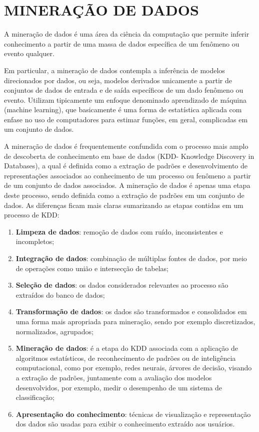\chapter{MINERAÇÃO DE DADOS}

A mineração de dados é uma área da ciência da computação que permite inferir conhecimento a partir de uma massa de dados específica de um fenômeno ou evento qualquer.

Em particular, a mineração de dados contempla a inferência de modelos direcionados por dados, ou seja, modelos derivados unicamente a partir de conjuntos de dados de entrada e de saída específicos de um dado fenômeno ou evento. Utilizam tipicamente um enfoque denominado aprendizado de máquina (machine learning), que basicamente é uma forma de estatística aplicada com enfase no uso de computadores para estimar funções, em geral, complicadas em um conjunto de dados.

A mineração de dados é frequentemente confundida com o processo mais amplo de descoberta de conhecimento em base de dados (KDD- Knowledge Discovery in Databases), a qual é definida como a extração de padrões e desenvolvimento de representações associados ao conhecimento de um processo ou fenômeno a partir de um conjunto de dados associados. A mineração de dados é apenas uma etapa deste processo, sendo definida como a extração de padrões em um conjunto de dados. As diferenças ficam mais claras sumarizando as etapas contidas em um processo de KDD:

\begin{enumerate}
\item {\bf Limpeza de dados}: remoção de dados com ruído, inconsistentes e incompletos;
\item {\bf Integração de dados}: combinação de múltiplas fontes de dados, por meio de operações como união e intersecção de tabelas;
\item {\bf Seleção de dados}: os dados considerados relevantes ao processo são extraídos do banco de dados;
\item {\bf Transformação de dados}: os dados são transformados e consolidados em uma forma mais apropriada para mineração, sendo por exemplo discretizados, normalizados, agrupados;
\item {\bf Mineração de dados}: é a etapa do KDD associada com a aplicação de algoritmos estatísticos, de reconhecimento de padrões ou de inteligência computacional, como por exemplo, redes neurais, árvores de decisão, visando a extração de padrões, juntamente com a avaliação dos modelos desenvolvidos, por exemplo, medir o desempenho de um sistema de classificação;
\item {\bf Apresentação do conhecimento}: técnicas de visualização e representação dos dados são usadas para exibir o conhecimento extraído aos usuários.
\end{enumerate}


